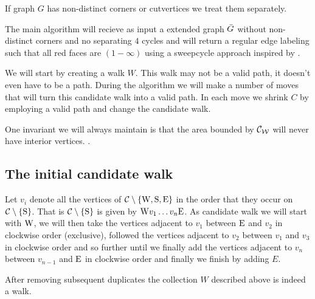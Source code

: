 If graph $G$ has non-distinct corners or cutvertices we treat them separately.


The main algorithm will recieve as input a extended graph $\bar{G}$ without non-distinct corners and no separating $4$ cycles and will return a regular edge labeling such that all red faces are $(1-\infty)$ using a sweepcycle approach inspired by \Fusy {} \cite{F}.

We will start by creating a walk $W$. This walk may not be a valid path, it doesn't even have to be a path. During the algorithm we will make a number of moves that will turn this candidate walk into a valid path. In each move we shrink $C$ by employing a valid path and change the candidate walk.

One invariant we will always maintain is that the area bounded by $\mathcal{C}_{\mathcal{W}}$ will never have interior vertices. .

\subsection{The initial candidate walk}
Let $v_i$ denote all the vertices of $\mathcal{C} \setminus \left\lbrace {\mathrm{W}, \mathrm{S}, \mathrm{E}} \right\rbrace$ in the order that they occur on $\mathcal{C} \setminus \left\lbrace {\mathrm{S}} \right\rbrace$.  That is $\mathcal{C} \setminus \left\lbrace {\mathrm{S}} \right\rbrace$ is given by $\mathrm{W} v_1 \ldots v_n \mathrm{E}$. 
As candidate walk we will start with $\mathrm{W}$, we will then take the vertices adjacent to $v_1$ between $\mathrm{E}$ and $v_2$ in clockwise order (exclusive), followed the vertices adjacent to $v_2$ between $v_1$ and $v_3$ in clockwise order and so further until we finally add the vertices adjacent to $v_n$ between $v_{n-1}$ and $\mathrm{E}$ in clockwise order and finally we finish by adding $E$.

\begin{lemma}
After removing subsequent duplicates the collection $W$ described above is indeed a walk.
\end{lemma}


